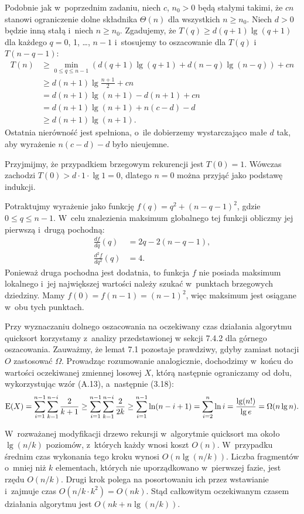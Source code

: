 Podobnie jak w~poprzednim zadaniu, niech $c$, $n_0>0$ będą stałymi takimi, że $cn$ stanowi ograniczenie dolne składnika $\Theta(n)$ dla wszystkich $n\ge n_0$.
Niech $d>0$ będzie inną stałą i~niech $n\ge n_0$.
Zgadujemy, że $T(q)\ge d(q+1)\lg(q+1)$ dla każdego $q=0$, 1, \dots, $n-1$ i~stosujemy to oszacowanie dla $T(q)$ i~$T(n-q-1)$:
\begin{align*}
    T(n) &\ge \min_{0\le q\le n-1}(d(q+1)\lg(q+1)+d(n-q)\lg(n-q))+cn \\
    &\ge d(n+1)\lg\frac{n+1}{2}+cn \\
	&= d(n+1)\lg(n+1)-d(n+1)+cn \\
	&= d(n+1)\lg(n+1)+n(c-d)-d \\
	&\ge d(n+1)\lg(n+1).
\end{align*}
Ostatnia nierówność jest spełniona, o~ile dobierzemy wystarczająco małe $d$ tak, aby wyrażenie $n(c-d)-d$ było nieujemne.

Przyjmijmy, że przypadkiem brzegowym rekurencji jest $T(0)=1$.
Wówczas zachodzi $T(0)>d\cdot1\cdot\lg1=0$, dlatego $n=0$ można przyjąć jako podstawę indukcji.

\exercise %
Potraktujmy wyrażenie jako funkcję $f(q)=q^2+(n-q-1)^2$, gdzie $0\le q\le n-1$.
W~celu znalezienia maksimum globalnego tej funkcji obliczmy jej pierwszą i~drugą pochodną:
\begin{align*}
    \frac{df}{dq}(q) &= 2q-2(n-q-1), \\
	\frac{d^2\!f}{dq^2}(q) &= 4.
\end{align*}
Ponieważ druga pochodna jest dodatnia, to funkcja $f$ nie posiada maksimum lokalnego i~jej największej wartości należy szukać w~punktach brzegowych dziedziny.
Mamy $f(0)=f(n-1)=(n-1)^2$, więc maksimum jest osiągane w~obu tych punktach.

\exercise %
Przy wyznaczaniu dolnego oszacowania na oczekiwany czas działania algorytmu quicksort korzystamy z~analizy przedstawionej w sekcji 7.4.2 dla górnego oszacowania.
Zauważmy, że lemat 7.1 pozostaje prawdziwy, gdyby zamiast notacji $O$ zastosować $\Omega$.
Prowadząc rozumowanie analogicznie, dochodzimy w~końcu do wartości oczekiwanej zmiennej losowej $X$, którą następnie ograniczamy od dołu, wykorzystując wzór (A.13), a~następnie (3.18):
\[
	\operatorname{E}(X) = \sum_{i=1}^{n-1}\sum_{k=1}^{n-i}\frac{2}{k+1} \ge \sum_{i=1}^{n-1}\sum_{k=1}^{n-i}\frac{2}{2k} \ge \sum_{i=1}^{n-1}\ln(n-i+1) = \sum_{i=2}^n\ln i = \frac{\lg(n!)}{\lg e} = \Omega(n\lg n).
\]

\exercise %
W~rozważanej modyfikacji drzewo rekursji w~algorytmie quicksort ma około $\lg(n/k)$ poziomów, z~których każdy wnosi koszt $O(n)$.
W~przypadku średnim czas wykonania tego kroku wynosi $O(n\lg(n/k))$.
Liczba fragmentów o~mniej niż $k$ elementach, których nie uporządkowano w~pierwszej fazie, jest rzędu $O(n/k)$.
Drugi krok polega na posortowaniu ich przez wstawianie i~zajmuje czas $O(n/k\cdot k^2)=O(nk)$.
Stąd całkowitym oczekiwanym czasem działania algorytmu jest $O(nk+n\lg(n/k))$.

